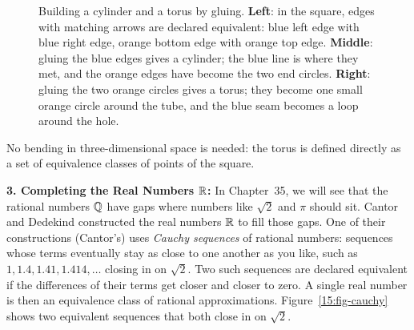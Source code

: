 \begin{figure}[htbp]
\caption{Building a cylinder and a torus by gluing. \textbf{Left}: in the square, edges with matching arrows are declared equivalent: blue left edge with blue right edge, orange bottom edge with orange top edge. \textbf{Middle}: gluing the blue edges gives a cylinder; the blue line is where they met, and the orange edges have become the two end circles. \textbf{Right}: gluing the two orange circles gives a torus; they become one small orange circle around the tube, and the blue seam becomes a loop around the hole.}
\label{15:fig-gluing}
\end{figure}

No bending in three-dimensional space is needed: the torus is defined directly as a set of equivalence classes of points of the square.

\textbf{3. Completing the Real Numbers $\mathbb{R}$:}
In Chapter~35, we will see that the rational numbers $\mathbb{Q}$ have gaps where numbers like $\sqrt{2}$ and $\pi$ should sit. Cantor and Dedekind constructed the real numbers $\mathbb{R}$ to fill those gaps. One of their constructions (Cantor's) uses \emph{Cauchy sequences} of rational numbers: sequences whose terms eventually stay as close to one another as you like, such as $1, 1.4, 1.41, 1.414, \dots$ closing in on $\sqrt{2}$. Two such sequences are declared equivalent if the differences of their terms get closer and closer to zero. A single real number is then an equivalence class of rational approximations. Figure~\ref{15:fig-cauchy} shows two equivalent sequences that both close in on $\sqrt{2}$.

